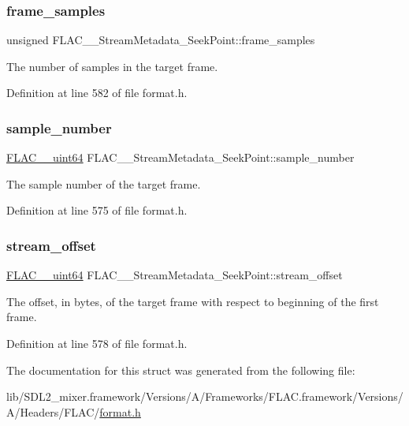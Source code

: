 \subsubsection{\texorpdfstring{frame\_samples}{frame\_samples}}
{\footnotesize\ttfamily unsigned F\+L\+A\+C\+\_\+\+\_\+\+Stream\+Metadata\+\_\+\+Seek\+Point\+::frame\+\_\+samples}

The number of samples in the target frame. 

Definition at line 582 of file format.\+h.

\mbox{\label{struct_f_l_a_c_____stream_metadata___seek_point_a96a62923f1443fd3a5a3498e701e6ecf}} 
\subsubsection{\texorpdfstring{sample\_number}{sample\_number}}
{\footnotesize\ttfamily \mbox{\hyperlink{ordinals_8h_aa78c8c70a3eb8a58af7436f278acde8e}{F\+L\+A\+C\+\_\+\+\_\+uint64}} F\+L\+A\+C\+\_\+\+\_\+\+Stream\+Metadata\+\_\+\+Seek\+Point\+::sample\+\_\+number}

The sample number of the target frame. 

Definition at line 575 of file format.\+h.

\mbox{\label{struct_f_l_a_c_____stream_metadata___seek_point_a6028398e99f937b002618af677d32c9f}} 
\subsubsection{\texorpdfstring{stream\_offset}{stream\_offset}}
{\footnotesize\ttfamily \mbox{\hyperlink{ordinals_8h_aa78c8c70a3eb8a58af7436f278acde8e}{F\+L\+A\+C\+\_\+\+\_\+uint64}} F\+L\+A\+C\+\_\+\+\_\+\+Stream\+Metadata\+\_\+\+Seek\+Point\+::stream\+\_\+offset}

The offset, in bytes, of the target frame with respect to beginning of the first frame. 

Definition at line 578 of file format.\+h.



The documentation for this struct was generated from the following file\+:\begin{DoxyCompactItemize}
\item 
lib/\+S\+D\+L2\+\_\+mixer.\+framework/\+Versions/\+A/\+Frameworks/\+F\+L\+A\+C.\+framework/\+Versions/\+A/\+Headers/\+F\+L\+A\+C/\mbox{\hyperlink{format_8h}{format.\+h}}\end{DoxyCompactItemize}
